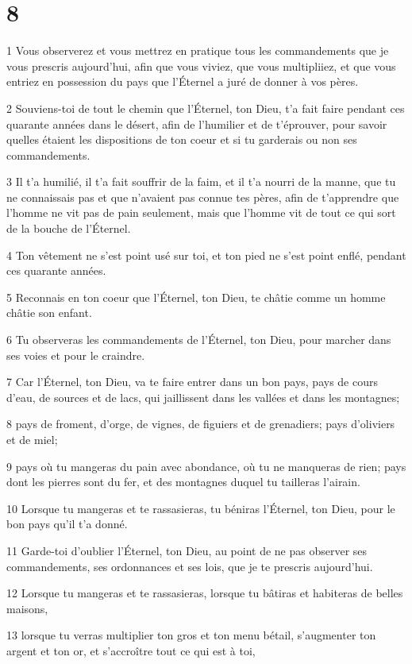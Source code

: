 \chapter{8}

\par 1 Vous observerez et vous mettrez en pratique tous les commandements que je vous prescris aujourd'hui, afin que vous viviez, que vous multipliiez, et que vous entriez en possession du pays que l'Éternel a juré de donner à vos pères.
\par 2 Souviens-toi de tout le chemin que l'Éternel, ton Dieu, t'a fait faire pendant ces quarante années dans le désert, afin de l'humilier et de t'éprouver, pour savoir quelles étaient les dispositions de ton coeur et si tu garderais ou non ses commandements.
\par 3 Il t'a humilié, il t'a fait souffrir de la faim, et il t'a nourri de la manne, que tu ne connaissais pas et que n'avaient pas connue tes pères, afin de t'apprendre que l'homme ne vit pas de pain seulement, mais que l'homme vit de tout ce qui sort de la bouche de l'Éternel.
\par 4 Ton vêtement ne s'est point usé sur toi, et ton pied ne s'est point enflé, pendant ces quarante années.
\par 5 Reconnais en ton coeur que l'Éternel, ton Dieu, te châtie comme un homme châtie son enfant.
\par 6 Tu observeras les commandements de l'Éternel, ton Dieu, pour marcher dans ses voies et pour le craindre.
\par 7 Car l'Éternel, ton Dieu, va te faire entrer dans un bon pays, pays de cours d'eau, de sources et de lacs, qui jaillissent dans les vallées et dans les montagnes;
\par 8 pays de froment, d'orge, de vignes, de figuiers et de grenadiers; pays d'oliviers et de miel;
\par 9 pays où tu mangeras du pain avec abondance, où tu ne manqueras de rien; pays dont les pierres sont du fer, et des montagnes duquel tu tailleras l'airain.
\par 10 Lorsque tu mangeras et te rassasieras, tu béniras l'Éternel, ton Dieu, pour le bon pays qu'il t'a donné.
\par 11 Garde-toi d'oublier l'Éternel, ton Dieu, au point de ne pas observer ses commandements, ses ordonnances et ses lois, que je te prescris aujourd'hui.
\par 12 Lorsque tu mangeras et te rassasieras, lorsque tu bâtiras et habiteras de belles maisons,
\par 13 lorsque tu verras multiplier ton gros et ton menu bétail, s'augmenter ton argent et ton or, et s'accroître tout ce qui est à toi,

